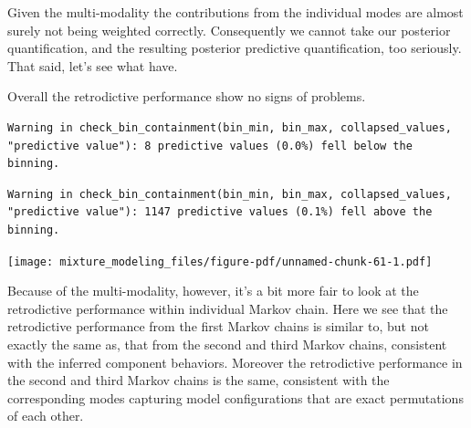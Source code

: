 \documentclass[
  letterpaper,
  DIV=11,
  numbers=noendperiod]{scrartcl}
\newenvironment{Shaded}{\begin{snugshade}}{\end{snugshade}}
\newcommand{\AttributeTok}[1]{\textcolor[rgb]{0.40,0.45,0.13}{#1}}
\newcommand{\DecValTok}[1]{\textcolor[rgb]{0.68,0.00,0.00}{#1}}
\newcommand{\FloatTok}[1]{\textcolor[rgb]{0.68,0.00,0.00}{#1}}
\newcommand{\FunctionTok}[1]{\textcolor[rgb]{0.28,0.35,0.67}{#1}}
\newcommand{\NormalTok}[1]{\textcolor[rgb]{0.00,0.23,0.31}{#1}}
\newcommand{\SpecialCharTok}[1]{\textcolor[rgb]{0.37,0.37,0.37}{#1}}
\newcommand{\StringTok}[1]{\textcolor[rgb]{0.13,0.47,0.30}{#1}}
\begin{document}
Given the multi-modality the contributions from the individual modes are
almost surely not being weighted correctly. Consequently we cannot take
our posterior quantification, and the resulting posterior predictive
quantification, too seriously. That said, let's see what have.

Overall the retrodictive performance show no signs of problems.

\begin{Shaded}
\end{Shaded}

\begin{verbatim}
Warning in check_bin_containment(bin_min, bin_max, collapsed_values,
"predictive value"): 8 predictive values (0.0%) fell below the binning.
\end{verbatim}

\begin{verbatim}
Warning in check_bin_containment(bin_min, bin_max, collapsed_values,
"predictive value"): 1147 predictive values (0.1%) fell above the binning.
\end{verbatim}

\texttt{[image: mixture\_modeling\_files/figure-pdf/unnamed-chunk-61-1.pdf]}

Because of the multi-modality, however, it's a bit more fair to look at
the retrodictive performance within individual Markov chain. Here we see
that the retrodictive performance from the first Markov chains is
similar to, but not exactly the same as, that from the second and third
Markov chains, consistent with the inferred component behaviors.
Moreover the retrodictive performance in the second and third Markov
chains is the same, consistent with the corresponding modes capturing
model configurations that are exact permutations of each other.
\end{document}
